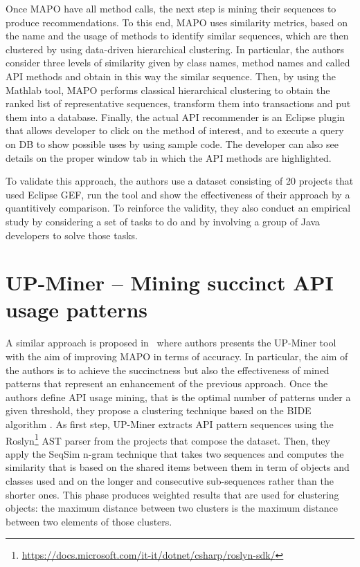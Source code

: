 Once MAPO have all method calls, the next step is mining their sequences to 
produce recommendations. To this end, 
%
MAPO uses similarity metrics, based on the name and the usage of methods to 
identify similar sequences, which are then clustered by using data-driven 
hierarchical clustering. In particular, the authors consider three levels of 
similarity given by class names, method names and called API methods and obtain 
in this way the similar sequence. Then, by using the Mathlab tool, MAPO 
performs classical hierarchical clustering to obtain the ranked list of 
representative sequences, transform them into transactions and put them into a 
database. Finally, the actual API recommender is an Eclipse plugin that allows 
developer to click on the method of interest, and to execute a query on DB to 
show possible uses by using sample code. The developer can also see details on 
the proper window tab in which the API methods are highlighted.

To validate this approach, the authors use a dataset consisting of 20 projects 
that used Eclipse GEF, run the tool and show the effectiveness of their 
approach by a quantitively comparison. To reinforce the validity, they also 
conduct an empirical study by considering a set of tasks to do and by involving 
a group of Java developers to solve those tasks.


\section{UP-Miner -- Mining succinct API usage patterns}

A similar approach is proposed in~\cite{wang_mining_2013} where authors 
presents the UP-Miner tool with the aim of improving MAPO in terms of accuracy. 
In particular, the aim of the authors is to achieve the succinctness but also 
the effectiveness of mined patterns that represent an enhancement of the 
previous  approach. Once the authors define API usage mining, that is the 
optimal number of patterns under a given threshold, they propose a clustering 
technique based on the BIDE algorithm \cite{BIDE}. As first step, UP-Miner 
extracts API pattern sequences using the 
Roslyn\footnote{\url{https://docs.microsoft.com/it-it/dotnet/csharp/roslyn-sdk/}}
 AST parser from the projects that compose the dataset. Then, they apply the 
SeqSim n-gram technique that takes two sequences and  computes the similarity 
that is based on the shared items between them in term of objects and classes 
used and on the longer and consecutive sub-sequences rather than the shorter 
ones. This phase produces weighted results that are used for clustering 
objects: the maximum distance between two clusters is the maximum distance 
between two elements of those clusters.

